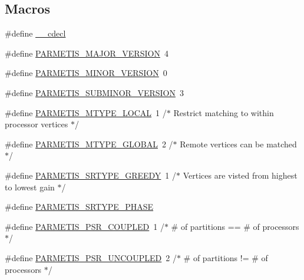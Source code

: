 \subsection*{Macros}
\begin{DoxyCompactItemize}
\item 
\#define \hyperlink{3rd_party_2parmetis-4_80_83_2include_2parmetis_8h_a238347d7669f8f1e9c83bfe63a2730c4}{\+\_\+\+\_\+cdecl}
\item 
\#define \hyperlink{3rd_party_2parmetis-4_80_83_2include_2parmetis_8h_aa48ba987f3ff8d56871c3fb2bed6d314}{P\+A\+R\+M\+E\+T\+I\+S\+\_\+\+M\+A\+J\+O\+R\+\_\+\+V\+E\+R\+S\+I\+ON}~4
\item 
\#define \hyperlink{3rd_party_2parmetis-4_80_83_2include_2parmetis_8h_ad51bc57fc5083572dd337e204de625ff}{P\+A\+R\+M\+E\+T\+I\+S\+\_\+\+M\+I\+N\+O\+R\+\_\+\+V\+E\+R\+S\+I\+ON}~0
\item 
\#define \hyperlink{3rd_party_2parmetis-4_80_83_2include_2parmetis_8h_a1d99bc97bff12181a8ad9588069a1f41}{P\+A\+R\+M\+E\+T\+I\+S\+\_\+\+S\+U\+B\+M\+I\+N\+O\+R\+\_\+\+V\+E\+R\+S\+I\+ON}~3
\item 
\#define \hyperlink{3rd_party_2parmetis-4_80_83_2include_2parmetis_8h_a8688bf16d43a979a690cef51e4e57d48}{P\+A\+R\+M\+E\+T\+I\+S\+\_\+\+M\+T\+Y\+P\+E\+\_\+\+L\+O\+C\+AL}~1    /$\ast$ Restrict matching to within processor vertices $\ast$/
\item 
\#define \hyperlink{3rd_party_2parmetis-4_80_83_2include_2parmetis_8h_af25d77131e25b013f79a5a7644c5792f}{P\+A\+R\+M\+E\+T\+I\+S\+\_\+\+M\+T\+Y\+P\+E\+\_\+\+G\+L\+O\+B\+AL}~2    /$\ast$ Remote vertices can be matched $\ast$/
\item 
\#define \hyperlink{3rd_party_2parmetis-4_80_83_2include_2parmetis_8h_ac0d490032ded504c8022884265a11546}{P\+A\+R\+M\+E\+T\+I\+S\+\_\+\+S\+R\+T\+Y\+P\+E\+\_\+\+G\+R\+E\+E\+DY}~1    /$\ast$ Vertices are visted from highest to lowest gain $\ast$/
\item 
\#define \hyperlink{3rd_party_2parmetis-4_80_83_2include_2parmetis_8h_a614e5181ee41475b1ffde007468e0526}{P\+A\+R\+M\+E\+T\+I\+S\+\_\+\+S\+R\+T\+Y\+P\+E\+\_\+P\+H\+A\+SE}
\item 
\#define \hyperlink{3rd_party_2parmetis-4_80_83_2include_2parmetis_8h_a4703e7e2556a1a53794358fc85b8c103}{P\+A\+R\+M\+E\+T\+I\+S\+\_\+\+P\+S\+R\+\_\+\+C\+O\+U\+P\+L\+ED}~1    /$\ast$ \# of partitions == \# of processors $\ast$/
\item 
\#define \hyperlink{3rd_party_2parmetis-4_80_83_2include_2parmetis_8h_a0462a45a6c6bafa94c1327994fd3d9bd}{P\+A\+R\+M\+E\+T\+I\+S\+\_\+\+P\+S\+R\+\_\+\+U\+N\+C\+O\+U\+P\+L\+ED}~2    /$\ast$ \# of partitions != \# of processors $\ast$/

\end{DoxyCompactItemize}
